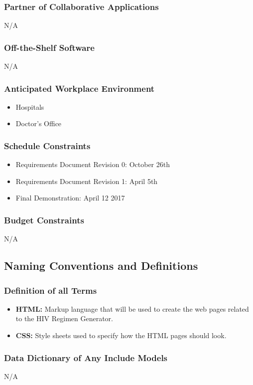 \documentclass[12pt]{article}
\begin{document}
\subsubsection{Partner of Collaborative Applications}
N/A
\subsubsection{Off-the-Shelf Software}
N/A
\subsubsection{Anticipated Workplace Environment}
\begin{itemize}
\item Hospitals
\item Doctor's Office
\end{itemize}
\subsubsection{Schedule Constraints}
\begin{itemize}
\item Requirements Document Revision 0: October 26th
\item Requirements Document Revision 1: April 5th
\item Final Demonstration: April 12 2017
\end{itemize}
\subsubsection{Budget Constraints}
N/A

\subsection{Naming Conventions and Definitions}
\subsubsection{Definition of all Terms}
\begin{itemize}
\item {\bf HTML:} Markup language that will be used to create the web pages related to the HIV Regimen Generator.
\item {\bf CSS:} Style sheets used to specify how the HTML pages should look.
\end{itemize}
\subsubsection{Data Dictionary of Any Include Models}
N/A
\end{document}
